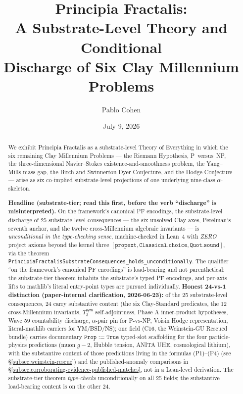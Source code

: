 \documentclass[11pt,a4paper]{amsart}
\title[Principia Fractalis: A Substrate-Level Theory and Six Clay Discharges]{Principia Fractalis:\\ A Substrate-Level Theory and Conditional\\ Discharge of Six Clay Millennium Problems}
\author{Pablo Cohen}
\date{July 9, 2026}
\theoremstyle{plain}
\theoremstyle{definition}
\begin{document}
\begin{abstract}
We exhibit Principia Fractalis as a substrate-level Theory of Everything in which the six remaining Clay Millennium Problems --- the Riemann Hypothesis, P~versus~NP, the three-dimensional Navier--Stokes existence-and-smoothness problem, the Yang--Mills mass gap, the Birch and Swinnerton-Dyer Conjecture, and the Hodge Conjecture --- arise as six co-implied substrate-level projections of one underlying nine-class $\alpha$-skeleton.

\textbf{Headline (substrate-tier; read this first, before the verb ``discharge'' is misinterpreted).} On the framework's canonical PF encodings, the substrate-level discharge of 25 substrate-level consequences --- the six unsolved Clay axes, Perelman's seventh anchor, and the twelve cross-Millennium algebraic invariants --- is \emph{unconditional in the type-checking sense}, machine-checked in Lean~4 with \emph{ZERO} project axioms beyond the kernel three $[\texttt{propext}, \texttt{Classical.choice}, \texttt{Quot.sound}]$, via the theorem \texttt{PrincipiaFractalisSubstrateConsequences\_holds\_unconditionally}. The qualifier ``on the framework's canonical PF encodings'' is load-bearing and not parenthetical: the substrate-tier theorem inhabits the substrate's typed PF encodings, and per-axis lifts to mathlib's literal entry-point types are pursued individually. \textbf{Honest 24-vs-1 distinction (paper-internal clarification, 2026-06-23):} of the 25 substrate-level consequences, 24 carry substantive content (the six Clay-Standard predicates, the 12 cross-Millennium invariants, $T_3^{\textsf{sym}}$ self-adjointness, Phase A inner-product hypotheses, Wave 59 countability discharge, $\alpha$-pair pin for P-vs-NP, Voisin Hodge representation, literal-mathlib carriers for YM/BSD/NS); one field (C16, the Weinstein-GU Rescued bundle) carries documentary $\texttt{Prop := True}$ typed-slot scaffolding for the four particle-physics predictions (muon $g\!-\!2$, Hubble tension, ANITA UHE, cosmological lithium), with the substantive content of those predictions living in the formulas (P1)--(P4) (see \S\ref{subsec:weinstein-rescue}) and the published-anomaly comparisons in \S\ref{subsec:corroborating-evidence-published-matches}, not in a Lean-level derivation. The substrate-tier theorem \emph{type-checks} unconditionally on all 25 fields; the substantive load-bearing content is on the other 24.


\end{abstract}
\end{document}
